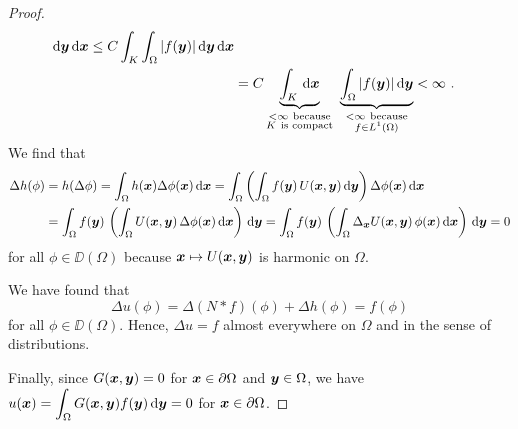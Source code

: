 \begin{proof}
\begin{align*}
\dx{\VEC{y}} \dx{\VEC{x}}
\leq C \int_K \int_{\Omega} |f(\VEC{y})| \dx{\VEC{y}} \dx{\VEC{x}} \\
&= C \underbrace{\int_K \dx{\VEC{x}}}_{\substack{<\infty \ \text{because}\\
K \ \text{is compact}}} \ 
\underbrace{\int_{\Omega} |f(\VEC{y})|
\dx{\VEC{y}}}_{\substack{<\infty\ \text{because}\\f \in L^1(\Omega)}}
< \infty \ .
\end{align*}
We find that
\begin{align*}
\Delta h(\phi) &= h(\Delta \phi)
= \int_{\Omega} h({\bm{x}}) \Delta \phi({\bm{x}}) \,\mathrm{d}{{\bm{x}}}
= \int_{\Omega} \left( \int_{\Omega} f({\bm{y}})\, U({\bm{x}},{\bm{y}})
\,\mathrm{d}{{\bm{y}}} \right) \Delta \phi({\bm{x}}) \,\mathrm{d}{{\bm{x}}} \\
&= \int_{\Omega} f({\bm{y}})\, \left( \int_{\Omega} U({\bm{x}},{\bm{y}})
\, \Delta \phi({\bm{x}}) \,\mathrm{d}{{\bm{x}}} \right) \,\mathrm{d}{{\bm{y}}}
= \int_{\Omega} f({\bm{y}}) \, \left( \int_{\Omega} 
\Delta_{{\bm{x}}}U({\bm{x}},{\bm{y}})
\, \phi({\bm{x}}) \,\mathrm{d}{{\bm{x}}} \right) \,\mathrm{d}{{\bm{y}}}
= 0
\end{align*}
for all $\phi \in \DD(\Omega)$ because
${\bm{x}} \mapsto U({\bm{x}},{\bm{y}})$ is harmonic on $\Omega$.

We have found that
\[
 \Delta u(\phi) = \Delta(N \ast f)(\phi) + \Delta h (\phi)
 = f(\phi)
\]
for all $\phi \in \DD(\Omega)$.  Hence, $\Delta u = f$ almost
everywhere on $\Omega$ and in the sense of distributions.

Finally, since
$G({\bm{x}},{\bm{y}})=0$ for ${\bm{x}}\in \partial \Omega$ and
${\bm{y}}\in \Omega$, we have
$\displaystyle u({\bm{x}})
= \int_{\Omega} G({\bm{x}},{\bm{y}})f({\bm{y}}) \,\mathrm{d}{{\bm{y}}} = 0$
for ${\bm{x}} \in \partial \Omega$.
\end{proof}

